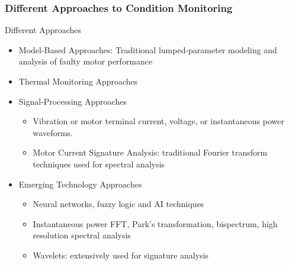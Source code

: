 \documentclass[9pt]{beamer}
\begin{document}
\begin{frame}
\frametitle{Different Approaches to Condition Monitoring}

\begin{block}{Different Approaches}
    \begin{itemize}
    \item Model-Based Approaches: Traditional lumped-parameter modeling and analysis of faulty motor performance
    \item Thermal Monitoring Approaches
    \item Signal-Processing Approaches
            \begin{itemize}
            \item Vibration or motor terminal current, voltage, or instantaneous power waveforms.
            \item Motor Current Signature Analysis: traditional Fourier transform techniques used for spectral analysis
            \end{itemize}
    \item Emerging Technology Approaches
            \begin{itemize}
            \item Neural networks, fuzzy logic and AI techniques
            \item Instantaneous power FFT, Park's transformation, bispectrum, high resolution spectral analysis
            \item \alert{Wavelets}: extensively used for signature analysis
            \end{itemize}
    \end{itemize}
\end{block}
\end{frame}
\end{document}
